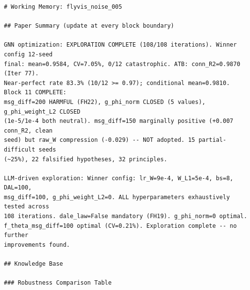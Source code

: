 \documentclass{article}
\begin{document}
\begin{tiny}
\begin{verbatim}
# Working Memory: flyvis_noise_005

## Paper Summary (update at every block boundary)

GNN optimization: EXPLORATION COMPLETE (108/108 iterations). Winner config 12-seed
final: mean=0.9584, CV=7.05%, 0/12 catastrophic. ATB: conn_R2=0.9870 (Iter 77).
Near-perfect rate 83.3% (10/12 >= 0.97); conditional mean=0.9810. Block 11 COMPLETE:
msg_diff=200 HARMFUL (FH22), g_phi_norm CLOSED (5 values), g_phi_weight_L2 CLOSED
(1e-5/1e-4 both neutral). msg_diff=150 marginally positive (+0.007 conn_R2, clean
seed) but raw_W compression (-0.029) -- NOT adopted. 15 partial-difficult seeds
(~25%), 22 falsified hypotheses, 32 principles.

LLM-driven exploration: Winner config: lr_W=9e-4, W_L1=5e-4, bs=8, DAL=100,
msg_diff=100, g_phi_weight_L2=0. ALL hyperparameters exhaustively tested across
108 iterations. dale_law=False mandatory (FH19). g_phi_norm=0 optimal.
f_theta_msg_diff=100 optimal (CV=0.21%). Exploration complete -- no further
improvements found.

## Knowledge Base

### Robustness Comparison Table


\end{verbatim}
\end{tiny}
\end{document}
